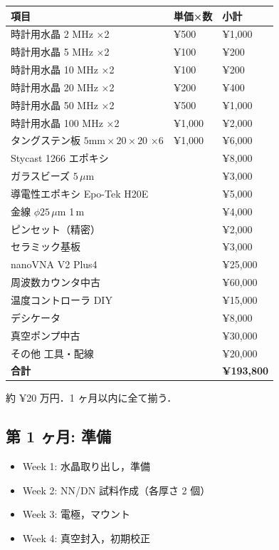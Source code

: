 \documentclass[11pt,a4paper]{article}
\begin{document}
\begin{center}
\begin{tabular}{lll}
\toprule
項目 & 単価×数 & 小計 \\
\midrule
時計用水晶 2 MHz ×2 & ¥500 & ¥1,000 \\
時計用水晶 5 MHz ×2 & ¥100 & ¥200 \\
時計用水晶 10 MHz ×2 & ¥100 & ¥200 \\
時計用水晶 20 MHz ×2 & ¥200 & ¥400 \\
時計用水晶 50 MHz ×2 & ¥500 & ¥1,000 \\
時計用水晶 100 MHz ×2 & ¥1,000 & ¥2,000 \\
タングステン板 $5\text{mm}\times 20\times 20$ ×6 & ¥1,000 & ¥6,000 \\
Stycast 1266 エポキシ & & ¥8,000 \\
ガラスビーズ $5\,\mu$m & & ¥3,000 \\
導電性エポキシ Epo-Tek H20E & & ¥5,000 \\
金線 $\phi 25\,\mu$m 1\,m & & ¥4,000 \\
ピンセット（精密）& & ¥2,000 \\
セラミック基板 & & ¥3,000 \\
nanoVNA V2 Plus4 & & ¥25,000 \\
周波数カウンタ中古 & & ¥60,000 \\
温度コントローラ DIY & & ¥15,000 \\
デシケータ & & ¥8,000 \\
真空ポンプ中古 & & ¥30,000 \\
その他 工具・配線 & & ¥20,000 \\
\midrule
\textbf{合計} & & \textbf{¥193,800} \\
\bottomrule
\end{tabular}
\end{center}

約 ¥20 万円．1 ヶ月以内に全て揃う．

\subsection{第 1 ヶ月: 準備}

\begin{itemize}
\item Week 1: 水晶取り出し，準備
\item Week 2: NN/DN 試料作成（各厚さ 2 個）
\item Week 3: 電極，マウント
\item Week 4: 真空封入，初期校正
\end{itemize}
\end{document}
